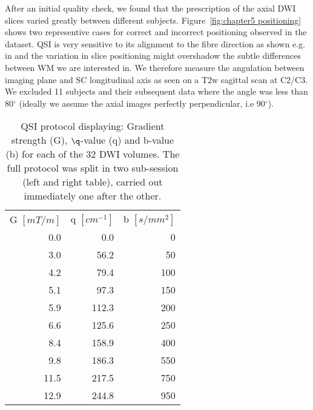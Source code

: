 After an initial quality check, we found that the prescription of the axial \gls{DWI} slices varied greatly between different subjects. Figure~\ref{fig:chapter5 positioning} shows two representive cases for correct and incorrect positioning observed in the dataset. \gls{QSI} is very sensitive to its alignment to the fibre direction as shown e.g. in \citep{Avram:2004} and the variation in slice positioning might overshadow the subtle differences between \gls{WM} we are interested in. We therefore measure the angulation between imaging plane and \gls{SC} longitudinal axis as seen on a T2w sagittal scan at C2/C3. We excluded 11 subjects and their subsequent data where the angle was less than 80$^\circ$ (ideally we assume the axial images perfectly perpendicular, i.e 90$^\circ$).

\begin{table}[p]
\begin{captionframe}
   \caption[QSI protocol displaying: Gradient strength (G), $\q$-value (q) and b-value (b) for each of the 32 DWI volumes.]{QSI protocol displaying: Gradient strength (G), $\q$-value (q) and b-value (b) for each of the 32 DWI volumes. The full protocol was split in two sub-session (left and right table), carried out immediately one after the other.}
   \label{tab:chap5exp1 protocol}
\end{captionframe}
\begin{tableframe}
	 \centering     
		 \begin{adjustbox}{width={0.47\textwidth},keepaspectratio}
        \begin{tabular}{rrr}
        \addlinespace
            \multicolumn{3}{l}{}\\
        \toprule
            G $[mT/m]$ & q $[cm^{-1}]$ & b $[s/mm^2]$ \\
            \cmidrule(r){1-1}\cmidrule(lr){2-2}\cmidrule(l){3-3}
            0.0   & 0.0   & 0 \\
            3.0   & 56.2  & 50 \\
            4.2   & 79.4  & 100 \\
            5.1   & 97.3  & 150 \\
            5.9   & 112.3 & 200 \\
            6.6   & 125.6 & 250 \\
            8.4   & 158.9 & 400 \\
            9.8   & 186.3 & 550 \\
            11.5  & 217.5 & 750 \\
            12.9  & 244.8 & 950 \\

\end{tabular}
\end{adjustbox}
\end{tableframe}
\end{table}
